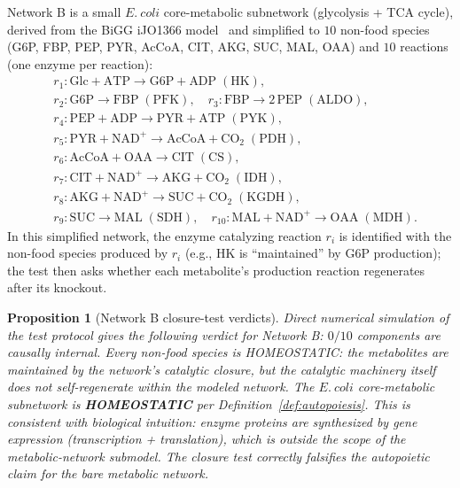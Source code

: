 \documentclass[11pt,a4paper]{article}
\theoremstyle{plain}
\newtheorem{proposition}[theorem]{Proposition}
\theoremstyle{definition}
\theoremstyle{remark}
\begin{document}
Network B is a small $E.~coli$ core-metabolic subnetwork (glycolysis +
TCA cycle), derived from the BiGG iJO1366 model~\cite{orth2011} and
simplified to $10$ non-food species (G6P, FBP, PEP, PYR, AcCoA, CIT,
AKG, SUC, MAL, OAA) and $10$ reactions (one enzyme per reaction):
\begin{equation*}
\begin{aligned}
&r_{1}:\text{Glc}+\text{ATP}\to\text{G6P}+\text{ADP}\;(\text{HK}),\\
&r_{2}:\text{G6P}\to\text{FBP}\;(\text{PFK}),\quad
r_{3}:\text{FBP}\to 2\,\text{PEP}\;(\text{ALDO}),\\
&r_{4}:\text{PEP}+\text{ADP}\to\text{PYR}+\text{ATP}\;(\text{PYK}),\\
&r_{5}:\text{PYR}+\text{NAD}^{+}\to\text{AcCoA}+\text{CO}_{2}\;(\text{PDH}),\\
&r_{6}:\text{AcCoA}+\text{OAA}\to\text{CIT}\;(\text{CS}),\\
&r_{7}:\text{CIT}+\text{NAD}^{+}\to\text{AKG}+\text{CO}_{2}\;(\text{IDH}),\\
&r_{8}:\text{AKG}+\text{NAD}^{+}\to\text{SUC}+\text{CO}_{2}\;(\text{KGDH}),\\
&r_{9}:\text{SUC}\to\text{MAL}\;(\text{SDH}),\quad
r_{10}:\text{MAL}+\text{NAD}^{+}\to\text{OAA}\;(\text{MDH}).
\end{aligned}
\end{equation*}
In this simplified network, the enzyme catalyzing reaction $r_{i}$ is
identified with the non-food species produced by $r_{i}$ (e.g., HK is
``maintained'' by G6P production); the test then asks whether each
metabolite's production reaction regenerates after its knockout.

\begin{proposition}[Network B closure-test verdicts]
\label{prop:netB-verdict}
Direct numerical simulation of the test protocol gives the following
verdict for Network B: $0/10$ components are causally internal. Every
non-food species is HOMEOSTATIC: the metabolites are maintained by the
network's catalytic closure, but the catalytic machinery itself does
not self-regenerate within the modeled network. The $E.~coli$
core-metabolic subnetwork is \textbf{HOMEOSTATIC} per
Definition~\ref{def:autopoiesis}. This is consistent with biological
intuition: enzyme proteins are synthesized by gene expression
(transcription + translation), which is outside the scope of the
metabolic-network submodel. The closure test correctly falsifies the
autopoietic claim for the bare metabolic network.
\end{proposition}
\end{document}
